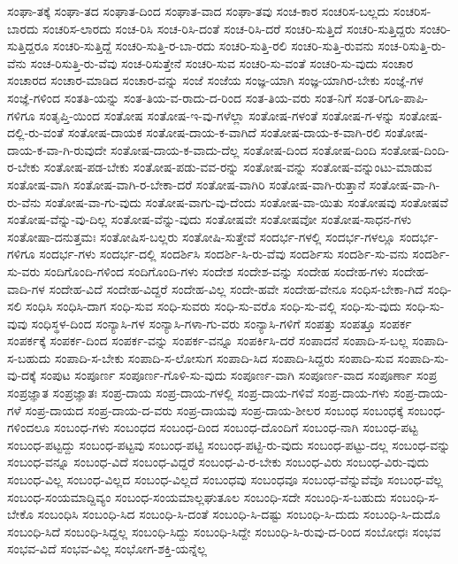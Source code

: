 {ಸಂಘಾ-ತಕ್ಕೆ
ಸಂಘಾ-ತದ
ಸಂಘಾತ-ದಿಂದ
ಸಂಘಾತ-ವಾದ
ಸಂಘಾ-ತವು
ಸಂಚ-ಕಾರ
ಸಂಚರಿಸ-ಬಲ್ಲದು
ಸಂಚರಿಸ-ಬಾರದು
ಸಂಚರಿಸ-ಲಾರದು
ಸಂಚ-ರಿಸಿ
ಸಂಚ-ರಿಸಿ-ದಂತೆ
ಸಂಚ-ರಿಸಿ-ದರೆ
ಸಂಚರಿ-ಸುತ್ತಿದೆ
ಸಂಚರಿ-ಸುತ್ತಿದ್ದರು
ಸಂಚರಿ-ಸುತ್ತಿದ್ದರೂ
ಸಂಚರಿ-ಸುತ್ತಿದ್ದೆ
ಸಂಚರಿ-ಸುತ್ತಿ-ರ-ಬಾ-ರದು
ಸಂಚರಿ-ಸುತ್ತಿ-ರಲಿ
ಸಂಚರಿ-ಸುತ್ತಿ-ರುವನು
ಸಂಚ-ರಿಸುತ್ತಿ-ರು-ವೆನು
ಸಂಚ-ರಿಸುತ್ತಿ-ರು-ವೆವು
ಸಂಚ-ರಿಸುತ್ತೇನೆ
ಸಂಚರಿ-ಸುವ
ಸಂಚರಿ-ಸು-ವಂತೆ
ಸಂಚರಿ-ಸು-ವುದು
ಸಂಚಾರ
ಸಂಚಾರದ
ಸಂಚಾರ-ಮಾಡಿದ
ಸಂಚಾರ-ವನ್ನು
ಸಂಜೆ
ಸಂಜೆಯ
ಸಂಜ್ಞ-ಯಾಗಿ
ಸಂಜ್ಞ-ಯಾಗಿರ-ಬೇಕು
ಸಂಜ್ಞೆ-ಗಳ
ಸಂಜ್ಞೆ-ಗಳಿಂದ
ಸಂತತಿ-ಯನ್ನು
ಸಂತ-ತಿಯ-ವ-ರಾದು-ದ-ರಿಂದ
ಸಂತ-ತಿಯ-ವರು
ಸಂತ-ನಿಗೆ
ಸಂತ-ರಿಗೂ-ಪಾಪಿ-ಗಳಿಗೂ
ಸಂತೃಪ್ತಿ-ಯಿಂದ
ಸಂತೋಷ
ಸಂತೋಷ-ಇ-ವು-ಗಳೆಲ್ಲಾ
ಸಂತೋಷ-ಗಳಂತೆ
ಸಂತೋಷ-ಗ-ಳನ್ನು
ಸಂತೋಷ-ದಲ್ಲಿ-ರು-ವಂತೆ
ಸಂತೋಷ-ದಾಯಕ
ಸಂತೋಷ-ದಾಯ-ಕ-ವಾಗಿದೆ
ಸಂತೋಷ-ದಾಯ-ಕ-ವಾಗಿ-ರಲಿ
ಸಂತೋಷ-ದಾಯ-ಕ-ವಾ-ಗಿ-ರುವುದೇ
ಸಂತೋಷ-ದಾಯ-ಕ-ವಾದು-ದೆಲ್ಲ
ಸಂತೋಷ-ದಿಂದ
ಸಂತೋಷ-ದಿಂದಿ
ಸಂತೋಷ-ದಿಂದಿ-ರ-ಬೇಕು
ಸಂತೋಷ-ಪಡ-ಬೇಕು
ಸಂತೋಷ-ಪಡು-ವವ-ರನ್ನು
ಸಂತೋಷ-ವನ್ನು
ಸಂತೋಷ-ವನ್ನುಂಟು-ಮಾಡುವ
ಸಂತೋಷ-ವಾಗಿ
ಸಂತೋಷ-ವಾಗಿ-ರ-ಬೇಕಾ-ದರೆ
ಸಂತೋಷ-ವಾಗಿರಿ
ಸಂತೋಷ-ವಾಗಿ-ರುತ್ತಾನೆ
ಸಂತೋಷ-ವಾ-ಗಿ-ರು-ವೆನು
ಸಂತೋಷ-ವಾ-ಗು-ವುದು
ಸಂತೋಷ-ವಾಗು-ವು-ದೆಂದು
ಸಂತೋಷ-ವಾ-ಯಿತು
ಸಂತೋಷವು
ಸಂತೋಷವೆ
ಸಂತೋಷ-ವೆನ್ನು-ವು-ದಿಲ್ಲ
ಸಂತೋಷ-ವೆನ್ನು-ವುದು
ಸಂತೋಷವೇ
ಸಂತೋಷವೋ
ಸಂತೋಷ-ಸಾಧನ-ಗಳು
ಸಂತೋಷಾ-ದನುತ್ತಮಃ
ಸಂತೋಷಿಸ-ಬಲ್ಲರು
ಸಂತೋಷಿ-ಸುತ್ತೇವೆ
ಸಂದರ್ಭ-ಗಳಲ್ಲಿ
ಸಂದರ್ಭ-ಗಳಲ್ಲೂ
ಸಂದರ್ಭ-ಗಳಿಗೂ
ಸಂದರ್ಭ-ಗಳು
ಸಂದರ್ಭ-ದಲ್ಲಿ
ಸಂದರ್ಶಿಸಿ
ಸಂದರ್ಶಿ-ಸಿ-ರು-ವೆವು
ಸಂದರ್ಶಿಸು
ಸಂದರ್ಶಿ-ಸು-ವನು
ಸಂದರ್ಶಿ-ಸು-ವರು
ಸಂದಿಗೊಂದಿ-ಗಳಿಂದ
ಸಂದಿಗೊಂದಿ-ಗಳು
ಸಂದೇಶ
ಸಂದೇಶ-ವನ್ನು
ಸಂದೇಹ
ಸಂದೇಹ-ಗಳು
ಸಂದೇಹ-ವಾದಿ-ಗಳ
ಸಂದೇಹ-ವಿದೆ
ಸಂದೇಹ-ವಿದ್ದರೆ
ಸಂದೇಹ-ವಿಲ್ಲ
ಸಂದೇ-ಹವೇ
ಸಂದೇಹ-ವೇನೂ
ಸಂಧಿಸ-ಬೇಕಾ-ಗಿದೆ
ಸಂಧಿ-ಸಲಿ
ಸಂಧಿಸಿ
ಸಂಧಿಸಿ-ದಾಗ
ಸಂಧಿ-ಸುವ
ಸಂಧಿ-ಸುವರು
ಸಂಧಿ-ಸು-ವರೊ
ಸಂಧಿ-ಸು-ವಲ್ಲಿ
ಸಂಧಿ-ಸು-ವುದು
ಸಂಧಿ-ಸು-ವುವು
ಸಂಧಿಸ್ಥಳ-ದಿಂದ
ಸಂನ್ಯಾಸಿ-ಗಳ
ಸಂನ್ಯಾಸಿ-ಗಳಾ-ಗು-ವರು
ಸಂನ್ಯಾಸಿ-ಗಳಿಗೆ
ಸಂಪತ್ತು
ಸಂಪತ್ತೂ
ಸಂಪರ್ಕ
ಸಂಪರ್ಕಕ್ಕೆ
ಸಂಪರ್ಕ-ದಿಂದ
ಸಂಪರ್ಕ-ವನ್ನು
ಸಂಪರ್ಕ-ವನ್ನೂ
ಸಂಪರ್ಕಿಸಿ-ದರೆ
ಸಂಪಾದನೆ
ಸಂಪಾದಿ-ಸ-ಬಲ್ಲ
ಸಂಪಾದಿ-ಸ-ಬಹುದು
ಸಂಪಾದಿ-ಸ-ಬೇಕು
ಸಂಪಾದಿ-ಸ-ಲೋಸುಗ
ಸಂಪಾದಿ-ಸಿದ
ಸಂಪಾದಿ-ಸಿದ್ದರು
ಸಂಪಾದಿ-ಸುವ
ಸಂಪಾದಿ-ಸು-ವು-ದಕ್ಕೆ
ಸಂಪುಟ
ಸಂಪೂರ್ಣ
ಸಂಪೂರ್ಣ-ಗೊಳಿ-ಸು-ವುದು
ಸಂಪೂರ್ಣ-ವಾಗಿ
ಸಂಪೂರ್ಣ-ವಾದ
ಸಂಪೂರ್ಣಾ
ಸಂಪ್ರ
ಸಂಪ್ರಜ್ಞಾತ
ಸಂಪ್ರಜ್ಞಾತಃ
ಸಂಪ್ರ-ದಾಯ
ಸಂಪ್ರ-ದಾಯ-ಗಳಲ್ಲಿ
ಸಂಪ್ರ-ದಾಯ-ಗಳಿವೆ
ಸಂಪ್ರ-ದಾಯ-ಗಳು
ಸಂಪ್ರ-ದಾಯ-ಗಳೆ
ಸಂಪ್ರ-ದಾಯದ
ಸಂಪ್ರ-ದಾಯ-ದ-ವರು
ಸಂಪ್ರ-ದಾಯವು
ಸಂಪ್ರ-ದಾಯ-ಶೀಲರ
ಸಂಬಂಧ
ಸಂಬಂಧಕ್ಕೆ
ಸಂಬಂಧ-ಗಳಿಂದಲೂ
ಸಂಬಂಧ-ಗಳು
ಸಂಬಂಧದ
ಸಂಬಂಧ-ದಿಂದ
ಸಂಬಂಧ-ದೊಂದಿಗೆ
ಸಂಬಂಧ-ನಾಗಿ
ಸಂಬಂಧ-ಪಟ್ಟ
ಸಂಬಂಧ-ಪಟ್ಟದ್ದು
ಸಂಬಂಧ-ಪಟ್ಟವು
ಸಂಬಂಧ-ಪಟ್ಟಿ
ಸಂಬಂಧ-ಪಟ್ಟಿ-ರು-ವುದು
ಸಂಬಂಧ-ಪಟ್ಟು-ದಲ್ಲ
ಸಂಬಂಧ-ವನ್ನು
ಸಂಬಂಧ-ವನ್ನೂ
ಸಂಬಂಧ-ವಿದೆ
ಸಂಬಂಧ-ವಿದ್ದರೆ
ಸಂಬಂಧ-ವಿ-ರ-ಬೇಕು
ಸಂಬಂಧ-ವಿರು
ಸಂಬಂಧ-ವಿರು-ವುದು
ಸಂಬಂಧ-ವಿಲ್ಲ
ಸಂಬಂಧ-ವಿಲ್ಲದ
ಸಂಬಂಧ-ವಿಲ್ಲದೆ
ಸಂಬಂಧವು
ಸಂಬಂಧವೂ
ಸಂಬಂಧ-ವೆನ್ನುವೆವೊ
ಸಂಬಂಧ-ವೆಲ್ಲ
ಸಂಬಂಧ-ಸಂಯಮಾದ್ದಿವ್ಯಂ
ಸಂಬಂಧ-ಸಂಯಮಾಲ್ಲಘುತೂಲ
ಸಂಬಂಧಿ-ಸದೇ
ಸಂಬಂಧಿ-ಸ-ಬಹುದು
ಸಂಬಂಧಿ-ಸ-ಬೇಕೊ
ಸಂಬಂಧಿಸಿ
ಸಂಬಂಧಿ-ಸಿದ
ಸಂಬಂಧಿ-ಸಿ-ದಂತೆ
ಸಂಬಂಧಿ-ಸಿ-ದಷ್ಟು
ಸಂಬಂಧಿ-ಸಿ-ದುದು
ಸಂಬಂಧಿ-ಸಿ-ದುದೊ
ಸಂಬಂಧಿ-ಸಿದೆ
ಸಂಬಂಧಿ-ಸಿದ್ದಲ್ಲ
ಸಂಬಂಧಿ-ಸಿದ್ದು
ಸಂಬಂಧಿ-ಸಿದ್ದೇ
ಸಂಬಂಧಿ-ಸಿ-ರುವು-ದ-ರಿಂದ
ಸಂಬೋಧಃ
ಸಂಭವ
ಸಂಭವ-ವಿದೆ
ಸಂಭವ-ವಿಲ್ಲ
ಸಂಭೋಗ-ಶಕ್ತಿ-ಯನ್ನೆಲ್ಲ
}
